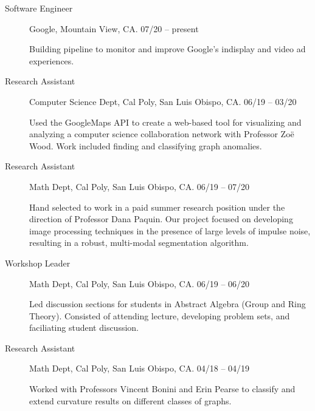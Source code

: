 \documentclass[11pt]{article}
\begin{document}
\begin{description}
    \item[Software Engineer]

	Google, Mountain View, CA.  07/20 -- present

	\begin{small}
	Building pipeline to monitor and improve Google's indisplay and video ad experiences.
	\end{small}

    \item[Research Assistant]

	Computer Science Dept, Cal Poly, San Luis Obispo, CA.  06/19 -- 03/20
	
	\begin{small}
	Used the GoogleMaps API to create a web-based tool for visualizing and analyzing a computer science collaboration network with Professor Zo\"{e} Wood.  Work included finding and classifying graph anomalies.
	\end{small}

    \item[Research Assistant]

	Math Dept, Cal Poly, San Luis Obispo, CA.  06/19 -- 07/20
	
	\begin{small}
	Hand selected to work in a paid summer research position under the direction
  of Professor Dana Paquin.  Our project focused on developing image processing techniques in the presence of large levels of impulse noise, resulting in a robust, multi-modal segmentation algorithm.

	\end{small}

    \item[Workshop Leader]

	Math Dept, Cal Poly, San Luis Obispo, CA.  06/19 -- 06/20

	\begin{small}
	Led discussion sections for students in Abstract Algebra (Group and Ring Theory).  Consisted of attending lecture, developing problem sets, and faciliating student discussion.
	\end{small}

    \item[Research Assistant]

	Math Dept, Cal Poly, San Luis Obispo, CA.  04/18 -- 04/19

	\begin{small}
	Worked with Professors Vincent Bonini and Erin Pearse to classify and extend curvature results on different classes of graphs.
	\end{small}


\end{description}
\end{document}
